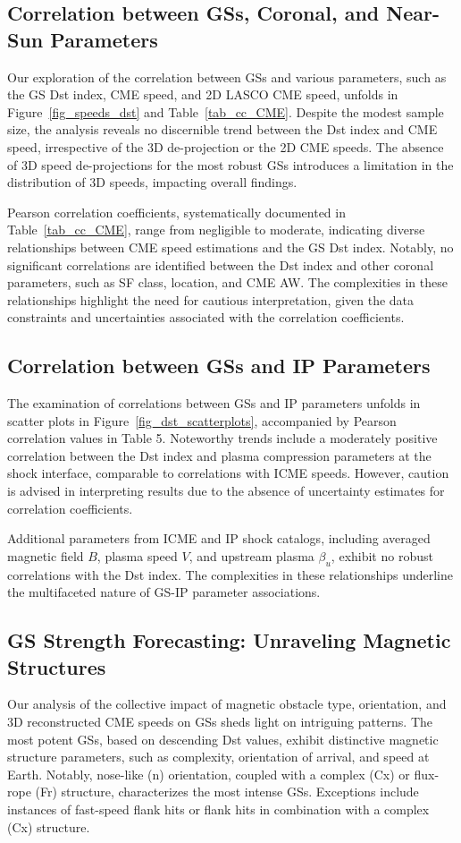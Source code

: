 \subsection{Correlation between GSs, Coronal, and Near-Sun Parameters}
Our exploration of the correlation between GSs and various parameters, such as the GS Dst index, CME speed, and 2D LASCO CME speed, unfolds in Figure~\ref{fig_speeds_dst} and Table~\ref{tab_cc_CME}. Despite the modest sample size, the analysis reveals no discernible trend between the Dst index and CME speed, irrespective of the 3D de-projection or the 2D CME speeds. The absence of 3D speed de-projections for the most robust GSs introduces a limitation in the distribution of 3D speeds, impacting overall findings.

Pearson correlation coefficients, systematically documented in Table~\ref{tab_cc_CME}, range from negligible to moderate, indicating diverse relationships between CME speed estimations and the GS Dst index. Notably, no significant correlations are identified between the Dst index and other coronal parameters, such as SF class, location, and CME AW. The complexities in these relationships highlight the need for cautious interpretation, given the data constraints and uncertainties associated with the correlation coefficients.

\subsection{Correlation between GSs and IP Parameters}
The examination of correlations between GSs and IP parameters unfolds in scatter plots in Figure~\ref{fig_dst_scatterplots}, accompanied by Pearson correlation values in Table 5. Noteworthy trends include a moderately positive correlation between the Dst index and plasma compression parameters at the shock interface, comparable to correlations with ICME speeds. However, caution is advised in interpreting results due to the absence of uncertainty estimates for correlation coefficients.

Additional parameters from ICME and IP shock catalogs, including averaged magnetic field $B$, plasma speed $V$, and upstream plasma $\beta_u$, exhibit no robust correlations with the Dst index. The complexities in these relationships underline the multifaceted nature of GS-IP parameter associations.

\subsection{GS Strength Forecasting: Unraveling Magnetic Structures}
Our analysis of the collective impact of magnetic obstacle type, orientation, and 3D reconstructed CME speeds on GSs sheds light on intriguing patterns. The most potent GSs, based on descending Dst values, exhibit distinctive magnetic structure parameters, such as complexity, orientation of arrival, and speed at Earth. Notably, nose-like (n) orientation, coupled with a complex (Cx) or flux-rope (Fr) structure, characterizes the most intense GSs. Exceptions include instances of fast-speed flank hits or flank hits in combination with a complex (Cx) structure.

